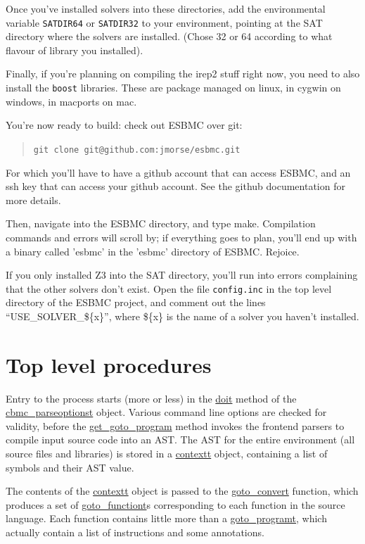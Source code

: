 \documentclass{article}
\begin{document}
Once you've installed solvers into these directories, add the environmental
variable \texttt{SATDIR64} or \texttt{SATDIR32} to your environment, pointing
at the SAT directory where the solvers are installed. (Chose 32 or 64 according
to what flavour of library you installed).

Finally, if you're planning on compiling the irep2 stuff right now, you need
to also install the \texttt{boost} libraries. These are package managed on
linux, in cygwin on windows, in macports on mac.

You're now ready to build: check out ESBMC over git:

\begin{quote}
\texttt{git clone git@github.com:jmorse/esbmc.git}
\end{quote}

For which you'll have to have a github account that can access ESBMC, and an
ssh key that can access your github account. See the github documentation for
more details.

Then, navigate into the ESBMC directory, and type make. Compilation
commands and errors will scroll by; if everything goes to plan, you'll end up
with a binary called 'esbmc' in the 'esbmc' directory of ESBMC. Rejoice.

If you only installed Z3 into the SAT directory, you'll run into errors
complaining that the other solvers don't exist. Open the file
\texttt{config.inc} in the top level directory of the ESBMC project, and
comment out the lines ``USE\_SOLVER\_\$\{x\}'', where \$\{x\} is the name of
a solver you haven't installed.

\section{Top level procedures}

Entry to the process starts (more or less) in the \url{doit} method of the
\url{cbmc_parseoptionst} object. Various command line options are checked
for validity, before the \url{get_goto_program} method invokes the
frontend parsers to compile input source code into an AST. The AST for the
entire environment (all source files and libraries) is stored in a
\url{contextt} object, containing a list of symbols and their AST value.

The contents of the \url{contextt} object is passed to the
\url{goto_convert} function, which produces a set of
\url{goto_functiont}s corresponding to each function in the source language.
Each function contains little more than a \url{goto_programt}, which
actually contain a list of instructions and some annotations.
\end{document}
